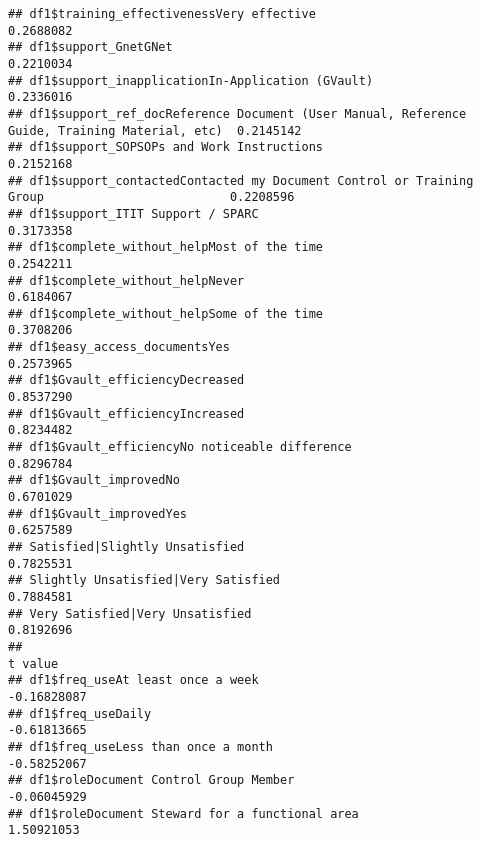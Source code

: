 \documentclass[
]{article}
\begin{document}
\begin{verbatim}
## df1$training_effectivenessVery effective                                                      0.2688082
## df1$support_GnetGNet                                                                          0.2210034
## df1$support_inapplicationIn-Application (GVault)                                              0.2336016
## df1$support_ref_docReference Document (User Manual, Reference Guide, Training Material, etc)  0.2145142
## df1$support_SOPSOPs and Work Instructions                                                     0.2152168
## df1$support_contactedContacted my Document Control or Training Group                          0.2208596
## df1$support_ITIT Support / SPARC                                                              0.3173358
## df1$complete_without_helpMost of the time                                                     0.2542211
## df1$complete_without_helpNever                                                                0.6184067
## df1$complete_without_helpSome of the time                                                     0.3708206
## df1$easy_access_documentsYes                                                                  0.2573965
## df1$Gvault_efficiencyDecreased                                                                0.8537290
## df1$Gvault_efficiencyIncreased                                                                0.8234482
## df1$Gvault_efficiencyNo noticeable difference                                                 0.8296784
## df1$Gvault_improvedNo                                                                         0.6701029
## df1$Gvault_improvedYes                                                                        0.6257589
## Satisfied|Slightly Unsatisfied                                                                0.7825531
## Slightly Unsatisfied|Very Satisfied                                                           0.7884581
## Very Satisfied|Very Unsatisfied                                                               0.8192696
##                                                                                                  t value
## df1$freq_useAt least once a week                                                             -0.16828087
## df1$freq_useDaily                                                                            -0.61813665
## df1$freq_useLess than once a month                                                           -0.58252067
## df1$roleDocument Control Group Member                                                        -0.06045929
## df1$roleDocument Steward for a functional area                                                1.50921053

\end{verbatim}
\end{document}
